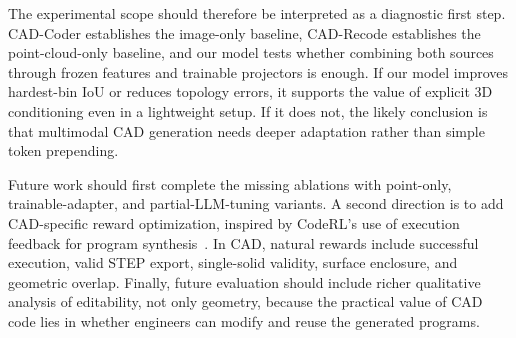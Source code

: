 \documentclass{article}
\begin{document}
The experimental scope should therefore be interpreted as a diagnostic first step. CAD-Coder establishes the image-only baseline, CAD-Recode establishes the point-cloud-only baseline, and our model tests whether combining both sources through frozen features and trainable projectors is enough. If our model improves hardest-bin IoU or reduces topology errors, it supports the value of explicit 3D conditioning even in a lightweight setup. If it does not, the likely conclusion is that multimodal CAD generation needs deeper adaptation rather than simple token prepending.

Future work should first complete the missing ablations with point-only, trainable-adapter, and partial-LLM-tuning variants. A second direction is to add CAD-specific reward optimization, inspired by CodeRL's use of execution feedback for program synthesis~\cite{le2022coderl}. In CAD, natural rewards include successful execution, valid STEP export, single-solid validity, surface enclosure, and geometric overlap. Finally, future evaluation should include richer qualitative analysis of editability, not only geometry, because the practical value of CAD code lies in whether engineers can modify and reuse the generated programs.



\end{document}
